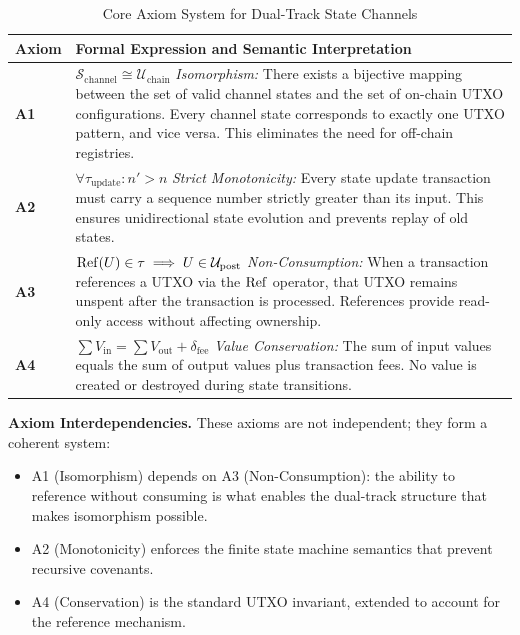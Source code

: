 \begin{table}[htbp]
\centering
\caption{Core Axiom System for Dual-Track State Channels}
\label{tab:axioms}
\small
\begin{tabularx}{\linewidth}{@{}p{1.0cm}X@{}}
\toprule
\textbf{Axiom} & \textbf{Formal Expression and Semantic Interpretation} \\
\midrule
\textbf{A1} & $\mathcal{S}_{\mathrm{channel}} \cong \mathcal{U}_{\mathrm{chain}}$ \newline
\textit{Isomorphism:} There exists a bijective mapping between the set of valid channel states and the set of on-chain UTXO configurations. Every channel state corresponds to exactly one UTXO pattern, and vice versa. This eliminates the need for off-chain registries. \\
\addlinespace
\textbf{A2} & $\forall \tau_{\mathrm{update}}: n' > n$ \newline
\textit{Strict Monotonicity:} Every state update transaction must carry a sequence number strictly greater than its input. This ensures unidirectional state evolution and prevents replay of old states. \\
\addlinespace
\textbf{A3} & $\operatorname{Ref}(U) \in \tau \implies U \in \mathcal{U}_{\mathrm{post}}$ \newline
\textit{Non-Consumption:} When a transaction references a UTXO via the $\operatorname{Ref}$ operator, that UTXO remains unspent after the transaction is processed. References provide read-only access without affecting ownership. \\
\addlinespace
\textbf{A4} & $\sum V_{\mathrm{in}} = \sum V_{\mathrm{out}} + \delta_{\mathrm{fee}}$ \newline
\textit{Value Conservation:} The sum of input values equals the sum of output values plus transaction fees. No value is created or destroyed during state transitions. \\
\bottomrule
\end{tabularx}
\end{table}

\textbf{Axiom Interdependencies.} These axioms are not independent; they form a coherent system:
\begin{itemize}
    \item A1 (Isomorphism) depends on A3 (Non-Consumption): the ability to reference without consuming is what enables the dual-track structure that makes isomorphism possible.
    \item A2 (Monotonicity) enforces the finite state machine semantics that prevent recursive covenants.
    \item A4 (Conservation) is the standard UTXO invariant, extended to account for the reference mechanism.
\end{itemize}

